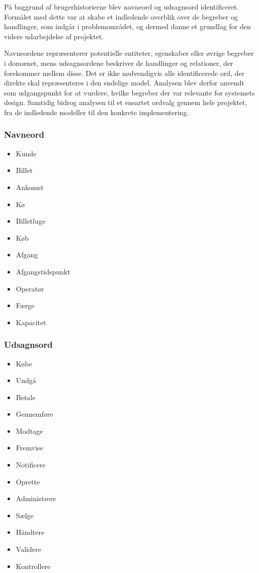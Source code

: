 \documentclass[a4paper, 11pt]{article}
\begin{document}
På baggrund af brugerhistorierne blev navneord og udsagnsord identificeret.
Formålet med dette var at skabe et indledende overblik over de begreber og handlinger, som
indgår i problemområdet, og dermed danne et grundlag for den videre udarbejdelse af projektet.

Navneordene repræsenterer potentielle entiteter, egenskaber eller øvrige begreber i domænet,
mens udsagnsordene beskriver de handlinger og relationer, der forekommer mellem disse. Det er
ikke nødvendigvis alle identificerede ord, der direkte skal repræsenteres i den endelige model.
Analysen blev derfor anvendt som udgangspunkt for at vurdere, hvilke begreber der var
relevante for systemets design. Samtidig bidrog analysen til et ensartet ordvalg gennem hele
projektet, fra de indledende modeller til den konkrete implementering.

\newpage

\subsubsection*{Navneord}

\begin{itemize}
\item Kunde
\item Billet
\item Ankomst
\item Kø
\item Billetluge
\item Køb
\item Afgang
\item Afgangstidspunkt
\item Operatør
\item Færge
\item Kapacitet
\end{itemize}

\subsubsection*{Udsagnsord}

\begin{itemize}
\item Købe
\item Undgå
\item Betale
\item Gennemføre
\item Modtage
\item Fremvise
\item Notificere
\item Oprette
\item Administrere
\item Sælge
\item Håndtere
\item Validere
\item Kontrollere
\end{itemize}
\end{document}
